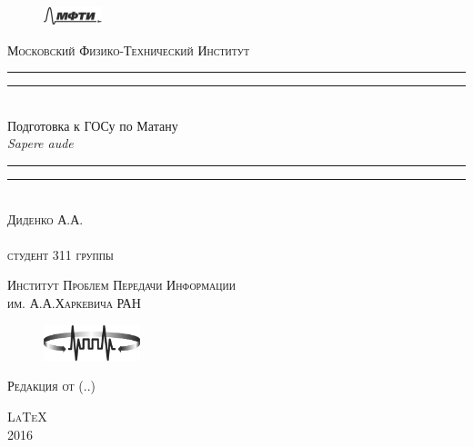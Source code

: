 \begin{titlepage}
\centering
\settowidth{\unitlength}{\LARGE\scshape Московский Физико-Технический Институт}

\begin{figure}[!h]
\center
\includegraphics[width=0.15\textwidth]{pictures/MIPT2}
\end{figure}
\vspace*{\baselineskip}
{\LARGE\scshape Московский Физико-Технический Институт}\\[\baselineskip]
\rule{\unitlength}{1.6pt}\vspace*{-\baselineskip}\vspace*{2pt}
\rule{\unitlength}{0.4pt}\\[1.8\baselineskip]
{\Huge Подготовка к ГОСу по Матану}\\[\baselineskip]
{\large \itshape Sapere aude}\\[0.7\baselineskip]
\rule{\unitlength}{0.4pt}\vspace*{-\baselineskip}\vspace{3.2pt}
\rule{\unitlength}{1.6pt}\\[\baselineskip]
{\Large\scshape Диденко А.А. \\ $ $\\студент 311 группы}\par
\vspace*{5\baselineskip}  

{\LARGE\scshape Институт Проблем Передачи Информации \\им. А.А.Харкевича РАН}
\begin{figure}[!h]
\centering
\includegraphics[width=0.25\textwidth]{pictures/IITP2}
\end{figure}


{\LARGE\scshape Редакция от \currenttime \;(\twodigit\day.\twodigit\month.\the\year)}\par %
\vfill
{\LARGE\scshape \LaTeX}\\[\baselineskip]
{\LARGE\scshape 2016}\par
\restoregeometry
\end{titlepage}